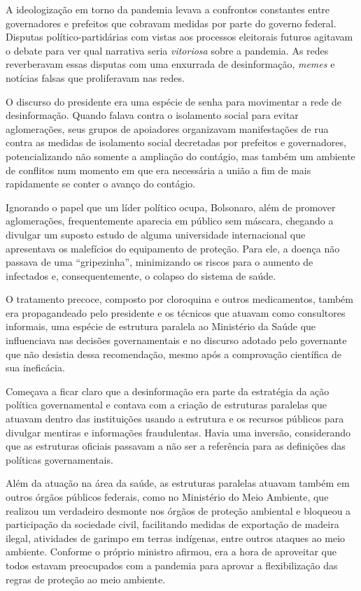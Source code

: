 A ideologização em torno da pandemia levava a confrontos constantes
entre governadores e prefeitos que cobravam medidas por parte do governo
federal. Disputas político-partidárias com vistas aos processos
eleitorais futuros agitavam o debate para ver qual narrativa seria
\textit{vitoriosa} sobre a pandemia. As redes reverberavam essas disputas com
uma enxurrada de desinformação, \textit{memes} e notícias falsas que proliferavam
nas redes.

O discurso do presidente era uma espécie de senha para movimentar a rede
de desinformação. Quando falava contra o isolamento social para evitar
aglomerações, seus grupos de apoiadores organizavam manifestações de rua
contra as medidas de isolamento social decretadas por prefeitos e
governadores, potencializando não somente a ampliação do contágio, mas
também um ambiente de conflitos num momento em que era necessária a união
a fim de mais rapidamente se conter o avanço do contágio.

Ignorando o papel que um líder político ocupa, Bolsonaro, além de
promover aglomerações, frequentemente aparecia em público sem máscara,
chegando a divulgar um suposto estudo de alguma universidade internacional
que apresentava os malefícios do equipamento de proteção. Para ele, a doença
não passava de uma ``gripezinha'', minimizando os riscos para o aumento de
infectados e, consequentemente, o colapso do sistema de saúde.

O tratamento precoce, composto por cloroquina e outros medicamentos,
também era propagandeado pelo presidente e os técnicos que atuavam como
consultores informais, uma espécie de estrutura paralela ao Ministério
da Saúde que influenciava nas decisões governamentais e no discurso
adotado pelo governante que não desistia dessa recomendação, mesmo após
a comprovação científica de sua ineficácia.

Começava a ficar claro que a desinformação era parte da estratégia da
ação política governamental e contava com a criação de estruturas
paralelas que atuavam dentro das instituições usando a estrutura e os
recursos públicos para divulgar mentiras e informações fraudulentas.
Havia uma inversão, considerando que as estruturas oficiais passavam a
não ser a referência para as definições das políticas governamentais.

Além da atuação na área da saúde, as estruturas paralelas atuavam também
em outros órgãos públicos federais, como no Ministério do Meio Ambiente,
que realizou um verdadeiro desmonte nos órgãos de proteção ambiental e
bloqueou a participação da sociedade civil, facilitando medidas de
exportação de madeira ilegal, atividades de garimpo em terras indígenas,
entre outros ataques ao meio ambiente. Conforme o próprio ministro
afirmou, era a hora de aproveitar que todos estavam preocupados com a
pandemia para aprovar a flexibilização das regras de proteção ao meio
ambiente.

